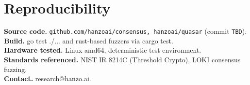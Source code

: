 \documentclass[11pt,letterpaper]{article}
\begin{document}
\section*{Reproducibility}
\textbf{Source code.} \texttt{github.com/hanzoai/consensus, hanzoai/quasar} (commit \texttt{TBD}).\\
\textbf{Build.} go test ./... and rust-based fuzzers via cargo test.\\
\textbf{Hardware tested.} Linux amd64, deterministic test environment.\\
\textbf{Standards referenced.} NIST IR 8214C (Threshold Crypto), LOKI consensus fuzzing.\\
\textbf{Contact.} research@hanzo.ai.
\end{document}

